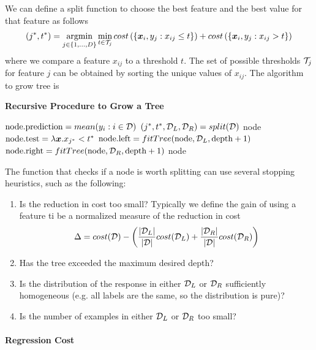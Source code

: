 We can define a split function to choose the best feature and the best value for that feature as follows
\begin{align*}
	(j^*,t^*)=\argmin_{j\in\{1,\dotsc,D\}}\min_{t\in\cT_j}cost\left(\{\vec{x}_i,y_j:x_{ij}\leq t\}\right)+cost\left(\{\vec{x}_i,y_j:x_{ij}>t\}\right)
\end{align*}
where we compare a feature $x_{ij}$ to a threshold $t$. The set of possible thresholds $\mathcal{T}_j$ for feature $j$ can be obtained by sorting the unique values of $x_{ij}$. The algorithm to grow tree is
\begin{algorithm}[H]
	\caption*{\bf Recursive Procedure to Grow a Tree}
	\begin{algorithmic}
		\State $\text{node.prediction}=mean(y_i:i\in\mathcal{D})$
		\State $(j^*,t^*,\mathcal{D}_L,\mathcal{D}_R)=split(\mathcal{D})$
		\State \Return node
		\Else
		\State $\text{node.test}=\lambda\boldsymbol{x}.x_{j^*}<t^*$
		\State $\text{node.left}=fitTree(\text{node},\mathcal{D}_L,\text{depth}+1)$
		\State $\text{node.right}=fitTree(\text{node},\mathcal{D}_R,\text{depth}+1)$
		\State \Return node
		\EndIf
		\EndFunction
	\end{algorithmic}
\end{algorithm}
The function that checks if a node is worth splitting can use several stopping heuristics, such as the following:
\begin{enumerate}
	\item Is the reduction in cost too small? Typically we define the gain of using a feature ti be a normalized measure of the reduction in cost
	\begin{align*}
		\Delta=cost(\mathcal{D})-\left(\frac{\left\vert\mathcal{D}_L\right\vert}{\left\vert\mathcal{D}\right\vert}cost(\mathcal{D}_L)+\frac{\left\vert\mathcal{D}_R\right\vert}{\left\vert\mathcal{D}\right\vert}cost(\mathcal{D}_R)\right)
	\end{align*}
	\item Has the tree exceeded the maximum desired depth?
	\item Is the distribution of the response in either $\mathcal{D}_L$ or $\mathcal{D}_R$ sufficiently homogeneous (e.g. all labels are the same, so the distribution is pure)?
	\item Is the number of examples in either $\mathcal{D}_L$ or $\mathcal{D}_R$ too small?
\end{enumerate}

\paragraph{Regression Cost}

